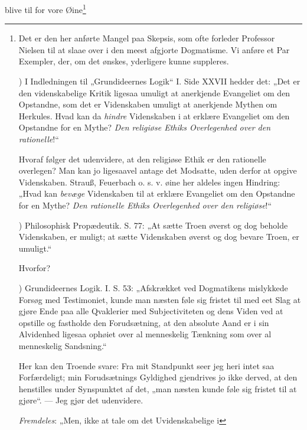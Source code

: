 \documentclass[12pt,a4paper]{book}
\begin{document}
blive til for vore Øine\footnote{Det er den her anførte Mangel paa Skepsis, som ofte forleder
Professor Nielsen til at slaae over i den meest afgjorte
Dogmatisme. Vi anføre et Par Exempler, der, om det
ønskes, yderligere kunne suppleres.
\par{}) I Indledningen til „Grundideernes Logik“ I. Side XXVII
hedder det: „Det er den videnskabelige Kritik ligesaa
umuligt at anerkjende Evangeliet om den Opstandne, som
det er Videnskaben umuligt at anerkjende Mythen om
Herkules. Hvad kan da \emph{hindre} Videnskaben i at erklære
Evangeliet om den Opstandne for en Mythe? \emph{Den
religiøse Ethiks Overlegenhed over den rationelle}!“
\par Hvoraf følger det udenvidere, at den religiøse Ethik er
den rationelle overlegen? Man kan jo ligesaavel antage det
Modsatte, uden derfor at opgive Videnskaben. Strauß,
Feuerbach o. s. v. øine her aldeles ingen Hindring:
„Hvad kan \emph{bevæge} Videnskaben til at erklære Evangeliet
om den Opstandne for en Mythe? \emph{Den rationelle
Ethiks Overlegenhed over den religiøse}!“
\par{}) Philosophisk Propædeutik. S. 77: „At sætte Troen øverst
og dog beholde Videnskaben, er muligt; at sætte Videnskaben
øverst og dog bevare Troen, er umuligt.“
\par Hvorfor?
\par{}) Grundideernes Logik. I. S. 53: „Afskrækket ved Dogmatikens
mislykkede Forsøg med Testimoniet, kunde man
næsten føle sig fristet til med eet Slag at gjøre Ende paa
alle Qvaklerier med Subjectiviteten og dens Viden ved
at opstille og fastholde den Forudsætning, at den absolute
Aand er i sin Alvidenhed ligesaa ophøiet over al menneskelig
Tænkning som over al menneskelig Sandsning.“
\par Her kan den Troende svare: Fra mit Standpunkt seer
jeg heri intet saa Forfærdeligt; min Forudsætnings Gyldighed
gjendrives jo ikke derved, at den henstilles under
Synspunktet af det, „man næsten kunde føle sig fristet til
at gjøre“. --- Jeg gjør det udenvidere.
\par\noindent \emph{Fremdeles}: „Men, ikke at tale om det Uvidenskabelige i
}
\end{document}
